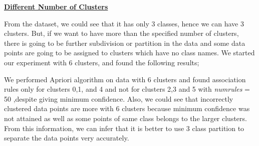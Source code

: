\documentclass[a4paper,10pt]{article}
\begin{document}
\par
\textbf{\underline{Different Number of Clusters}} \par
From the dataset, we could see that it has only 3 classes, hence we can have 3 clusters. But, if we want to have 
more than the specified number of clusters, there is going to be further subdivision or partition in the data and 
some data points are going to be assigned to clusters which have no class names.
\newpage
We started our experiment with 6 clusters, and found the following results;

We performed Apriori algorithm on data with 6 clusters and found association rules only for clusters 0,1, and 4
and not for clusters 2,3 and 5 with \textit{numrules} = 50 ,despite giving minimum confidence. Also, we could see that incorrectly clustered 
data points are more with 6 clusters because minimum confidence was not attained as well as some points of same 
class belongs to the larger clusters. From this information, we can infer that it is better to use 3 class 
partition to separate the data points very accurately.
\end{document}
